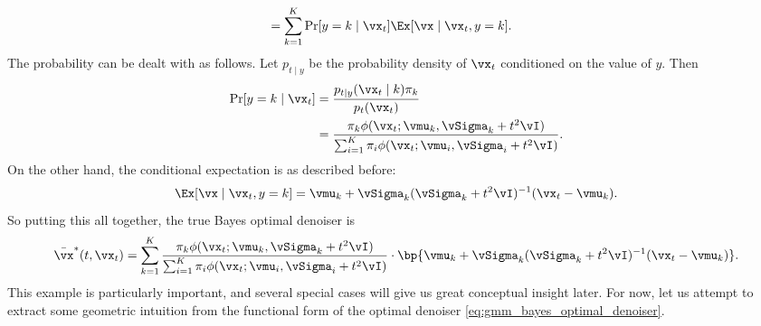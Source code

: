 \documentclass[../../book-main.tex]{subfiles}
\begin{document}
\begin{example}
\begin{align}
		&= \sum_{k = 1}^{K}\Pr[y = k \mid \vx_{t}]\Ex[\vx \mid \vx_{t}, y = k].
	\end{align}
	The probability can be dealt with as follows. Let \(p_{t \mid y}\) be the probability density of \(\vx_{t}\) conditioned on the value of \(y\). Then
	\begin{align}
		\Pr[y = k \mid \vx_{t}]
		&= \frac{p_{t \mid y}(\vx_{t} \mid k)\pi_{k}}{p_{t}(\vx_{t})} \\ 
		&= \frac{\pi_{k}\phi(\vx_{t} ; \vmu_{k}, \vSigma_{k}
		+ t^{2}\vI)}{\sum_{i = 1}^{K}\pi_{i}\phi(\vx_{t} ; \vmu_{i}, \vSigma_{i} + t^{2}\vI)}.
	\end{align}
	On the other hand, the conditional expectation is as described before:
	\begin{equation}
		\Ex[\vx \mid \vx_{t}, y = k] = \vmu_{k} + \vSigma_{k}(\vSigma_{k} + t^{2}\vI)^{-1}(\vx_{t} - \vmu_{k}).
	\end{equation}
	So putting this all together, the true Bayes optimal denoiser is 
	\begin{equation}\label{eq:gmm_bayes_optimal_denoiser}
		\bar{\vx}^{\ast}(t, \vx_{t}) = \sum_{k = 1}^{K}\frac{\pi_{k}\phi(\vx_{t}
		;\vmu_{k}, \vSigma_{k} + t^{2}\vI)}{\sum_{i = 1}^{K}\pi_{i}\phi(\vx_{t}
		;\vmu_{i}, \vSigma_{i} + t^{2}\vI)}\cdot\bp{\vmu_{k} + \vSigma_{k}(\vSigma_{k} + t^{2}\vI)^{-1}(\vx_{t} - \vmu_{k})}.
	\end{equation}
	This example is particularly important, and several special cases will give us great conceptual insight later. For now, let us attempt to extract some geometric intuition from the functional form of the optimal denoiser \eqref{eq:gmm_bayes_optimal_denoiser}.


\end{example}
\end{document}
